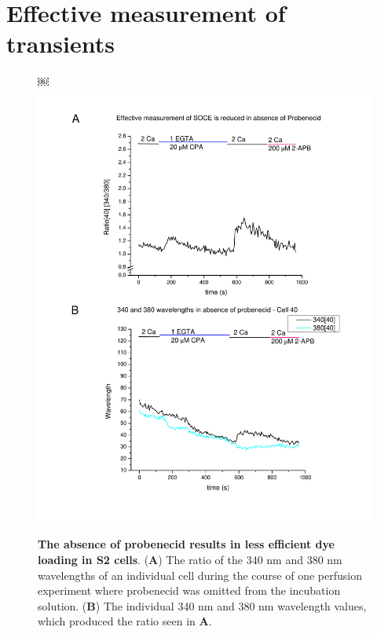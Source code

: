 \section{Effective measurement of \Ca{} transients}
\begin{figure}[!ht]
￼\includegraphics[scale=0.5]{Figures/s2_cell40_nopro.pdf}
\caption[Absence of probenecid gives less efficient dye loading in S2 cells]
	{{\bfseries The absence of probenecid results in less efficient dye loading in S2 cells}. ({\bfseries A}) The ratio of the 340 nm and 380 nm wavelengths of an individual cell during the course of one perfusion experiment where probenecid was omitted from the incubation solution. ({\bfseries B}) The individual 340 nm and 380 nm wavelength values, which produced the ratio seen in {\bfseries A}.}
\label{fig:s2_no_pro}
\end{figure}


